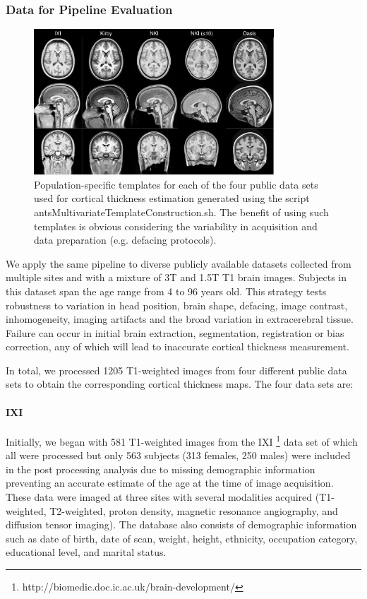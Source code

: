 \subsubsection{Data for Pipeline Evaluation}

\begin{figure}
  \centering
  \includegraphics[width=90mm]{Figures/templates.pdf}
  \caption{Population-specific templates for each of the four public data sets used 
  for cortical thickness 
  estimation generated using the script antsMultivariateTemplateConstruction.sh. 
  The benefit of using such templates is obvious considering the variability in
  acquisition and data preparation (e.g. defacing protocols).
  }
  \label{fig:template}
\end{figure}

We apply the same pipeline to diverse publicly available datasets collected
from multiple sites and with a mixture of 3T and
1.5T T1 brain images.  Subjects in this dataset
span the age range from 4 to 96 years old.  This strategy tests robustness to
variation in head position, brain shape, defacing, image contrast, inhomogeneity, imaging
artifacts and the broad variation in extracerebral tissue.  Failure
can occur in initial brain extraction, segmentation, registration or
bias correction, any of which will lead to inaccurate cortical
thickness measurement.                           

In total, we processed 1205 T1-weighted images from four different
public data sets to obtain the corresponding cortical thickness maps.                           
The four data sets are: 
                                          
\paragraph{IXI}
Initially, we began with 581 T1-weighted images from the IXI%
\footnote{
http://biomedic.doc.ic.ac.uk/brain-development/
}
 data set
of which all were processed but only 563 subjects 
(313 females, 250 males) were included in the post processing analysis due to 
missing demographic information preventing an accurate estimate of 
the age at the time of image acquisition.  These data were
imaged at three sites 
with several modalities acquired (T1-weighted, T2-weighted, proton density, magnetic 
resonance angiography, and diffusion tensor imaging).  The 
database also consists of  demographic information such as date of birth, date
of scan, weight,
height, ethnicity, occupation category, educational level, and marital status.

